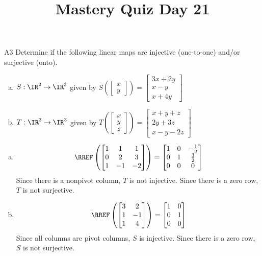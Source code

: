 \documentclass{sbgLAquiz}
\title{Mastery Quiz Day 21 }
\begin{document}
\begin{problem}{A3}
Determine if the following linear maps are injective (one-to-one) and/or surjective (onto).
\begin{enumerate}[(a)]
\item $S: \IR^2 \rightarrow \IR^3$ given by $S\left(\begin{bmatrix} x \\ y  \end{bmatrix} \right) = \begin{bmatrix} 3x+2y \\ x-y \\ x+4y \end{bmatrix} $
\item $T: \IR^3 \rightarrow \IR^3$ given by $T\left(\begin{bmatrix} x \\ y \\ z  \end{bmatrix} \right) = \begin{bmatrix} x+y+z \\ 2y+3z \\ x-y-2z \end{bmatrix} $
\end{enumerate}
\end{problem}

\begin{solution}
\begin{enumerate}[(a)]
\item $$\RREF\left( \begin{bmatrix} 1 &  1 & 1 \\ 0  & 2 & 3 \\ 1  & -1 & -2 \end{bmatrix} \right) = \begin{bmatrix} 1 &  0 & -\frac{1}{2} \\ 0  & 1 & \frac{3}{2} \\ 0& 0 & 0  \end{bmatrix}$$
Since there is a nonpivot column, $T$ is not injective.  Since there is a zero row, $T$ is not surjective.
\item $$\RREF \left( \begin{bmatrix} 3 & 2 \\ 1 & -1 \\ 1 & 4 \end{bmatrix} \right) = \begin{bmatrix} 1 & 0 \\ 0 & 1 \\ 0 & 0 \end{bmatrix}$$
Since all columns are pivot columns, $S$ is injective.  Since there is a zero row, $S$ is not surjective.
\end{enumerate}
\end{solution}
\end{document}
